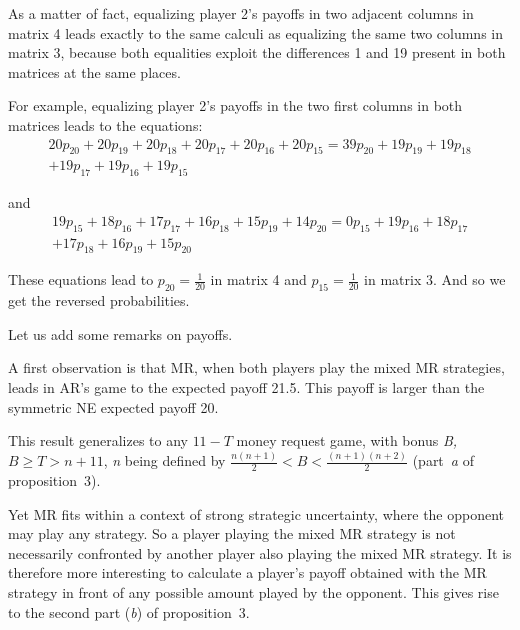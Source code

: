 \begin{Article}
\begin{refsection}[Umbhauer]
As a matter of fact, equalizing player 2's payoffs in two adjacent
columns in matrix 4 leads exactly to the same calculi as equalizing the
same two columns in matrix 3, because both equalities exploit the
differences 1 and 19 present in both matrices at the same places.

For example, equalizing player 2's payoffs in the two first columns in
both matrices leads to the equations:
\begin{equation*}
\begin{split}
  20p_{20} + 20p_{19} + 20p_{18} + 20p_{17} + 20p_{16} + 20p_{15} = 39p_{20} + 19p_{19} + 19p_{18}\\ + 19p_{17} + 19p_{16} + 19p_{15}  
\end{split}
\end{equation*}

\noindent {} and
\begin{equation*}
\begin{split}
    19p_{15} + 18p_{16} + 17p_{17} + 16p_{18} + 15p_{19} + 14p_{20} = 0p_{15} + 19p_{16} + 18p_{17}\\ + 17p_{18} + 16p_{19} + 15p_{20}
\end{split}
\end{equation*}

\noindent {}

These equations lead to \(p_{20} = \frac{1}{20}\) in matrix 4 and
\(p_{15} = \frac{1}{20}\) in matrix 3. And so we get the reversed
probabilities.

Let us add some remarks on payoffs.

A first observation is that MR, when both players play the mixed MR
strategies, leads in AR's game to the expected payoff 21.5. This payoff
is larger than the symmetric NE expected payoff 20.

This result generalizes to any \(11 - T\) money request game, with bonus
\emph{B,} \(B \geq T > n + 11\), \emph{n} being defined by
\(\frac{n(n + 1)}{2} < B < \frac{(n + 1)(n + 2)}{2}\) (part~\emph{a} of
proposition~3).

Yet MR fits within a context of strong strategic uncertainty, where the
opponent may play any strategy. So a player playing the mixed MR
strategy is not necessarily confronted by another player also playing
the mixed MR strategy. It is therefore more interesting to calculate a
player's payoff obtained with the MR strategy in front of any possible
amount played by the opponent. This gives rise to the second part
(\emph{b}) of proposition~3.


\end{refsection}
\end{Article}

